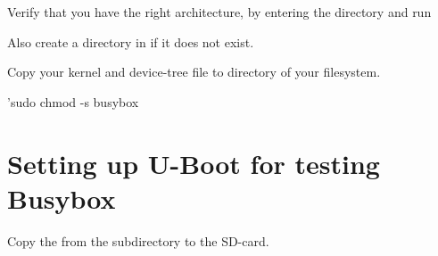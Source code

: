 Verify that you have the right architecture, by entering the 
directory and run  

Also create a  directory in  if it does not exist.

Copy your kernel and device-tree file to  directory of your filesystem.


'sudo chmod -s busybox


\clearpage
\section{Setting up U-Boot for testing Busybox}

Copy the  from the subdirectory to the SD-card.

